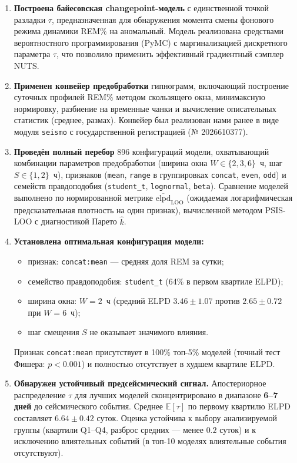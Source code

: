 \documentclass[14pt]{mmcs_article}
\begin{document}
\begin{enumerate}
	\item \textbf{Построена байесовская changepoint-модель}
	с единственной точкой разладки $\tau$,
	предназначенная для обнаружения момента смены
	фонового режима динамики REM\% на аномальный.
	Модель реализована средствами вероятностного
	программирования (PyMC) с маргинализацией
	дискретного параметра $\tau$, что позволило
	применить эффективный градиентный сэмплер NUTS.
	
	\item \textbf{Применен конвейер предобработки}
	гипнограмм, включающий построение суточных
	профилей REM\% методом скользящего окна,
	минимаксную нормировку, разбиение на временные
	чанки и вычисление описательных статистик
	(среднее, размах). Конвейер был реализован нами ранее в виде
	модуля \texttt{seismo} с государственной
	регистрацией (№ 2026610377).
	
	\item \textbf{Проведён полный перебор} 896
	конфигураций модели, охватывающий комбинации
	параметров предобработки (ширина окна $W \in
	\{2, 3, 6\}$~ч, шаг $S \in \{1, 2\}$~ч),
	признаков (\texttt{mean}, \texttt{range} в
	группировках \texttt{concat}, \texttt{even},
	\texttt{odd}) и семейств правдоподобия
	(\texttt{student\_t}, \texttt{lognormal},
	\texttt{beta}). Сравнение моделей выполнено по
	нормированной метрике
	$\overline{\mathrm{elpd}}_{\mathrm{LOO}}$
	(ожидаемая логарифмическая предсказательная
	плотность на один признак), вычисленной методом
	PSIS-LOO с диагностикой Парето $\hat{k}$.
	
	\item \textbf{Установлена оптимальная конфигурация
		модели:}
	\begin{itemize}
		\item признак: \texttt{concat:mean} — средняя
		доля REM за сутки;
		\item семейство правдоподобия:
		\texttt{student\_t} (64\% в первом
		квартиле ELPD);
		\item ширина окна: $W = 2$~ч (средний ELPD
		$3.46 \pm 1.07$ против $2.65 \pm 0.72$
		при $W = 6$~ч);
		\item шаг смещения $S$ не оказывает значимого
		влияния.
	\end{itemize}
	Признак \texttt{concat:mean} присутствует в 100\%
	топ-5\% моделей (точный тест Фишера: $p < 0.001$)
	и полностью отсутствует в худшем квартиле ELPD.
	
	\item \textbf{Обнаружен устойчивый предсейсмический
		сигнал.} Апостериорное распределение $\tau$ для
	лучших моделей сконцентрировано в диапазоне
	\textbf{6--7 дней} до сейсмического события.
	Среднее $\mathbb{E}[\tau]$ по первому квартилю
	ELPD составляет $6.64 \pm 0.42$ суток. Оценка
	устойчива к выбору анализируемой группы
	(квартили Q1--Q4, разброс средних — менее $0.2$
	суток) и к исключению влиятельных событий
	(в топ-10 моделях влиятельные события
	отсутствуют).
	

\end{enumerate}
\end{document}

